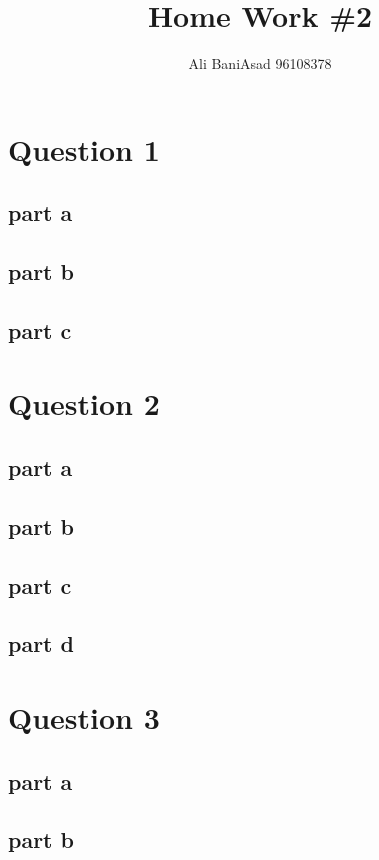 \documentclass{article}
\title{Home Work \#2}
\author{Ali BaniAsad 96108378}
\begin{document}
	\maketitle
	\section{Question 1}
	
	\subsection{part a}
	
	\subsection{part b}\label{Q1_b}
	
	\subsection{part c}
	
	\section{Question 2}
	\subsection{part a}
	
	\subsection{part b}
	
	\subsection{part c}
	
	\subsection{part d}
	
	\section{Question 3}
	
	\subsection{part a}
	
	\subsection{part b}
	
	\newpage
	\tableofcontents
\end{document}
